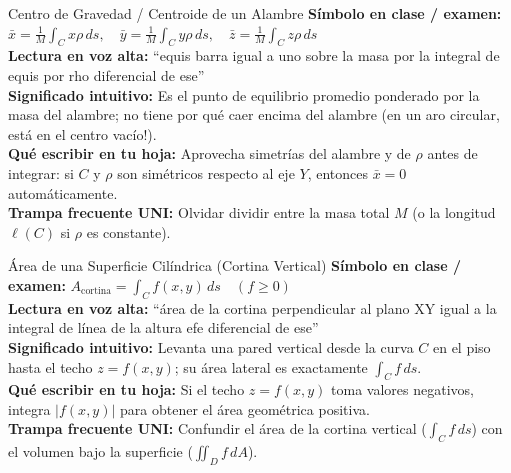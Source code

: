 \documentclass[11pt,a4paper]{article}
\begin{document}
\begin{definicionbox}{Centro de Gravedad / Centroide de un Alambre}
\textbf{Símbolo en clase / examen:} $\bar{x} = \frac{1}{M}\int_C x\rho\,ds,\quad \bar{y} = \frac{1}{M}\int_C y\rho\,ds,\quad \bar{z} = \frac{1}{M}\int_C z\rho\,ds$\\[0.15cm]
\textbf{Lectura en voz alta:} ``equis barra igual a uno sobre la masa por la integral de equis por rho diferencial de ese''\\[0.12cm]
\textbf{Significado intuitivo:} Es el punto de equilibrio promedio ponderado por la masa del alambre; no tiene por qué caer encima del alambre (en un aro circular, está en el centro vacío!).\\[0.12cm]
\textbf{Qué escribir en tu hoja:} Aprovecha simetrías del alambre y de $\rho$ antes de integrar: si $C$ y $\rho$ son simétricos respecto al eje $Y$, entonces $\bar{x} = 0$ automáticamente.\\[0.12cm]
\textbf{Trampa frecuente UNI:} Olvidar dividir entre la masa total $M$ (o la longitud $\ell(C)$ si $\rho$ es constante).
\end{definicionbox}

\begin{definicionbox}{Área de una Superficie Cilíndrica (Cortina Vertical)}
\textbf{Símbolo en clase / examen:} $A_{\text{cortina}} = \int_C f(x,y)\,ds \quad (f \ge 0)$\\[0.15cm]
\textbf{Lectura en voz alta:} ``área de la cortina perpendicular al plano XY igual a la integral de línea de la altura efe diferencial de ese''\\[0.12cm]
\textbf{Significado intuitivo:} Levanta una pared vertical desde la curva $C$ en el piso hasta el techo $z = f(x,y)$; su área lateral es exactamente $\int_C f\,ds$.\\[0.12cm]
\textbf{Qué escribir en tu hoja:} Si el techo $z = f(x,y)$ toma valores negativos, integra $|f(x,y)|$ para obtener el área geométrica positiva.\\[0.12cm]
\textbf{Trampa frecuente UNI:} Confundir el área de la cortina vertical ($\int_C f\,ds$) con el volumen bajo la superficie ($\iint_D f\,dA$).
\end{definicionbox}
\end{document}
